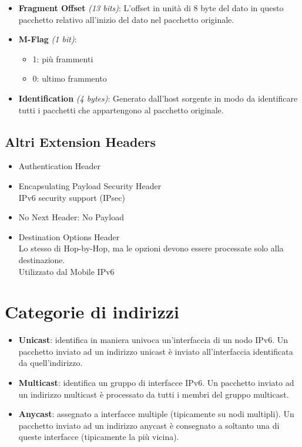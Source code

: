 \documentclass{article}
\begin{document}
\begin{itemize}
    \item \textbf{Fragment Offset} \textit{(13 bits)}: L’offset in unità di 8 byte del dato in questo pacchetto relativo all’inizio del dato nel pacchetto originale.
    \item \textbf{M-Flag} \textit{(1 bit)}:
    \begin{itemize}
        \item 1: più frammenti
        \item 0: ultimo frammento
    \end{itemize}
    \item \textbf{Identification} \textit{(4 bytes)}: Generato dall’host sorgente in modo da identificare tutti i pacchetti che appartengono al pacchetto originale.
\end{itemize}

\subsection{Altri Extension Headers}
\begin{itemize}
    \item Authentication Header
    \item Encapsulating Payload Security Header \\
    IPv6 security support (IPsec)
    \item No Next Header: No Payload
    \item Destination Options Header \\
    Lo stesso di Hop-by-Hop, ma le opzioni devono essere processate solo alla destinazione. \\
    Utilizzato dal Mobile IPv6
\end{itemize}

\newpage
\section{Categorie di indirizzi}
\begin{itemize}
    \item \textbf{Unicast}: identifica in maniera univoca un’interfaccia di un nodo IPv6. Un pacchetto inviato ad un indirizzo unicast è inviato all’interfaccia identificata da quell’indirizzo.
    \item \textbf{Multicast}: identifica un gruppo di interfacce IPv6. Un pacchetto inviato ad un indirizzo multicast è processato da tutti i membri del gruppo multicast.
    \item \textbf{Anycast}: assegnato a interfacce multiple (tipicamente su nodi multipli). Un pacchetto inviato ad un indirizzo anycast è consegnato a soltanto una di queste interfacce (tipicamente la più vicina).
\end{itemize}
\end{document}
